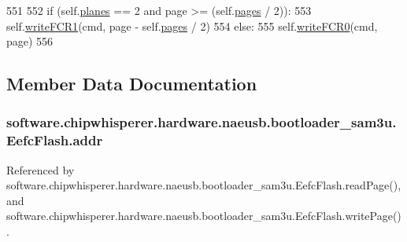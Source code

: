 \begin{DoxyCode}
551 
552         \textcolor{keywordflow}{if} (self.\hyperlink{classsoftware_1_1chipwhisperer_1_1hardware_1_1naeusb_1_1bootloader__sam3u_1_1EefcFlash_a03df377a46b66c2a7dbb43fecc0d16eb}{planes} == 2 \textcolor{keywordflow}{and} page >= (self.\hyperlink{classsoftware_1_1chipwhisperer_1_1hardware_1_1naeusb_1_1bootloader__sam3u_1_1EefcFlash_a8e3d0a12d9e4e1e65bdf8fec5a17d247}{pages} / 2)):
553             self.\hyperlink{classsoftware_1_1chipwhisperer_1_1hardware_1_1naeusb_1_1bootloader__sam3u_1_1EefcFlash_a2dcb5f8d2daab0a339919c1d3240e4c0}{writeFCR1}(cmd, page - self.\hyperlink{classsoftware_1_1chipwhisperer_1_1hardware_1_1naeusb_1_1bootloader__sam3u_1_1EefcFlash_a8e3d0a12d9e4e1e65bdf8fec5a17d247}{pages} / 2)
554         \textcolor{keywordflow}{else}:
555             self.\hyperlink{classsoftware_1_1chipwhisperer_1_1hardware_1_1naeusb_1_1bootloader__sam3u_1_1EefcFlash_aa255adaa75a4bd666c3b290b573ae7dd}{writeFCR0}(cmd, page)
556 
\end{DoxyCode}


\subsection{Member Data Documentation}
\hypertarget{classsoftware_1_1chipwhisperer_1_1hardware_1_1naeusb_1_1bootloader__sam3u_1_1EefcFlash_a0949e0e8b6f67c716607d39f4014b979}{}
\subsubsection[{addr}]{\setlength{\rightskip}{0pt plus 5cm}software.\+chipwhisperer.\+hardware.\+naeusb.\+bootloader\+\_\+sam3u.\+Eefc\+Flash.\+addr}\label{classsoftware_1_1chipwhisperer_1_1hardware_1_1naeusb_1_1bootloader__sam3u_1_1EefcFlash_a0949e0e8b6f67c716607d39f4014b979}


Referenced by software.\+chipwhisperer.\+hardware.\+naeusb.\+bootloader\+\_\+sam3u.\+Eefc\+Flash.\+read\+Page(), and software.\+chipwhisperer.\+hardware.\+naeusb.\+bootloader\+\_\+sam3u.\+Eefc\+Flash.\+write\+Page().

\hypertarget{classsoftware_1_1chipwhisperer_1_1hardware_1_1naeusb_1_1bootloader__sam3u_1_1EefcFlash_a2a7305c795772d47fd04a1f3b5bcb3ab}{}
